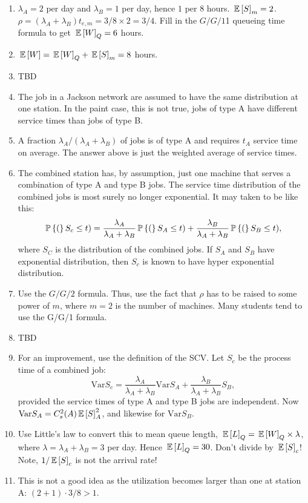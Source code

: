 \begin{question}[use=false]
\begin{solution}
\begin{enumerate}
\begin{lstlisting}
label("$\lambda_B$", (3.75,-1.75), align=N);
draw((2,0)--(5, -1), arrow=ArcArrow(TeXHead));
label("$B$", (6,-0.75), align=N);
draw(queueB);
draw((7,-1)--(9, -1), arrow=ArcArrow(TeXHead));
\end{lstlisting}
\item 
  $\lambda_A=2$ per day and $\lambda_B = 1$ per day, hence $1$ per 8
  hours. $\E S_{m}=2$.
  $\rho=(\lambda_A+\lambda_B)t_{e,m} = 3/8 \times 2=3/4$. Fill in
  the $G/G/1$1 queueing time formula to get $\E W_Q=6$ hours.  
\item  $\E W = \E W_Q + \E S_{m} = 8$ hours.
\item     TBD
\item   The job in a Jackson network are assumed to have the same
  distribution at one station. In the paint case, this is not true,
  jobs of type A have different service times than jobs of type B.  
\item  A fraction $\lambda_A/(\lambda_A + \lambda_B)$ of jobs is of
  type A and requires $t_A$ service time on average. The answer above
  is just the weighted average of service times.
\item  The combined station has, by assumption, just one machine that
  serves a combination of type A and type B jobs.  The service time
  distribution of the combined jobs is most surely no longer
  exponential. It may taken to be like this:
  \begin{equation*}
    \P(S_c \leq t) = 
\frac{\lambda_A}{\lambda_A + \lambda_B} \P(S_A \leq t) + 
\frac{\lambda_B}{\lambda_A + \lambda_B} \P(S_B \leq t),
  \end{equation*}
  where $S_C$ is the distribution of the combined jobs.  If $S_A$ and
  $S_B$ have exponential distribution, then $S_c$ is known to have
  hyper exponential distribution.
\item  Use the $G/G/2$ formula. Thus, use the fact that $\rho$ has to be
  raised to some power of $m$, where $m=2$ is the number of
  machines. Many students tend to  use the G/G/1 formula.
\item     TBD
\item  For an improvement, use the definition of the SCV. Let $S_c$ be
  the process time of a combined job: 
  \begin{equation*}
    \text{Var} S_c = \frac{\lambda_A}{\lambda_A + \lambda_B} \text{Var}S_A +
  \frac{\lambda_B}{\lambda_A + \lambda_B} S_B,
  \end{equation*}
  provided the service times of type A and type B jobs are
  independent. Now $\text{Var} S_A = C_s^2(A) \E S_A^2$, and likewise
  for $\text{Var}S_B$.
\item   Use Little's law to convert this to mean queue length,
  $\E L_Q= \E W_Q \times \lambda$, where
  $\lambda=\lambda_A + \lambda_B = 3$ per day. Hence $\E L_Q = 30$.
  Don't divide by $\E S_c$! Note, $1/\E S_c$ is not the arrival rate!
\item This is not a good idea as the utilization becomes larger than
  one at station A: $(2+1)\cdot 3/8>1$.
\end{enumerate}
\end{solution}
\end{question}

